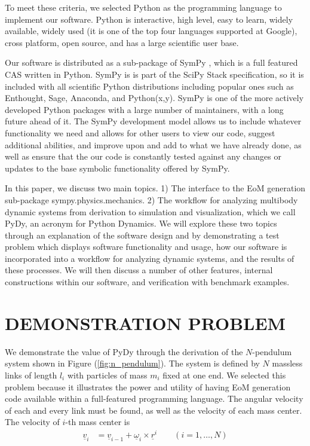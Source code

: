 \documentclass[twocolumn,10pt]{asme2e}
\begin{document}
To meet these criteria, we selected Python as the programming language to
implement our software. Python is interactive, high level, easy to learn,
widely available, widely used (it is one of the top four languages supported at
Google), cross platform, open source, and has a large scientific user base.

Our software is distributed as a sub-package of SymPy \cite{sympy2012}, which
is a full featured CAS written in Python. SymPy is is part of the SciPy Stack
\cite{scipystack} specification, so it is included with all scientific Python
distributions including popular ones such as Enthought, Sage, Anaconda, and
Python(x,y). SymPy is one of the more actively developed Python packages with a
large number of maintainers, with a long future ahead of it. The SymPy
development model allows us to include whatever functionality we need and
allows for other users to view our code, suggest additional abilities, and
improve upon and add to what we have already done, as well as ensure that the
our code is constantly tested against any changes or updates to the base
symbolic functionality offered by SymPy.

In this paper, we discuss two main topics. 1) The interface to the EoM
generation sub-package sympy.physics.mechanics. 2) The workflow for analyzing
multibody dynamic systems from derivation to simulation and visualization,
which we call PyDy, an acronym for Python Dynamics. We will explore these two
topics through an explanation of the software design and by demonstrating a
test problem which displays software functionality and usage, how our software
is incorporated into a workflow for analyzing dynamic systems, and the results
of these processes. We will then discuss a number of other features, internal
constructions within our software, and verification with benchmark examples.
\section*{DEMONSTRATION PROBLEM}
We demonstrate the value of PyDy through the derivation of the $N$-pendulum
system shown in Figure (\ref{fig:n_pendulum}).  The system is defined by $N$
massless links of length $l_i$ with particles of mass $m_i$ fixed at one end.
We selected this problem because it illustrates the power and utility of having
EoM generation code available within a full-featured programming language. The
angular velocity of each and every link must be found, as well as the velocity
of each mass center. The velocity of $i$-th mass center is
\begin{align*}
  \underline{v}_i &= \underline{v}_{i-1} + \underline{\omega}_i \times
  \underline{r}^i \qquad (i = 1,\dots,N)
\end{align*}
\end{document}
